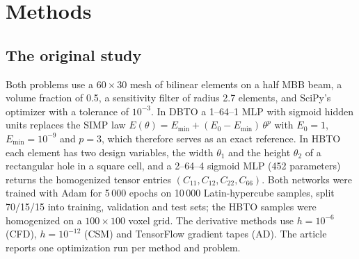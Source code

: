 \section{Methods}

\subsection{The original study}
Both problems use a $60\times30$ mesh of bilinear elements on a half MBB beam,
a volume fraction of 0.5, a sensitivity filter of radius
2.7 elements\supercite{Sigmund:2001,Sigmund:1998}, and SciPy's
 optimizer\supercite{Virtanen:2020} with a tolerance of
$10^{-3}$. In DBTO a 1--64--1 MLP with sigmoid hidden units replaces the SIMP
law $E(\theta)=E_\mathrm{min}+(E_0-E_\mathrm{min})\,\theta^{p}$ with $E_0=1$,
$E_\mathrm{min}=10^{-9}$ and $p=3$, which therefore serves as an exact
reference. In HBTO each element has two design variables, the width $\theta_1$
and the height $\theta_2$ of a rectangular hole in a square cell, and a
2--64--4 sigmoid MLP (452 parameters) returns the homogenized tensor entries
$(C_{11},C_{12},C_{22},C_{66})$. Both networks were trained with Adam for
5\,000 epochs on 10\,000 Latin-hypercube samples, split 70/15/15 into training,
validation and test sets; the HBTO samples were homogenized on a $100\times100$
voxel grid. The derivative methods use $h=10^{-6}$ (CFD), $h=10^{-12}$ (CSM)
and TensorFlow gradient tapes\supercite{Abadi:2016} (AD). The article reports
one optimization run per method and problem.


